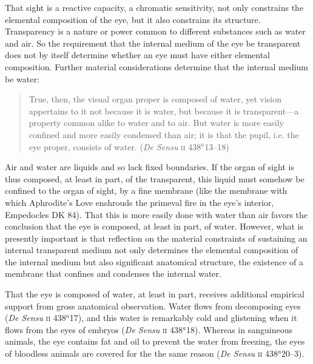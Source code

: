 That sight is a reactive capacity, a chromatic sensitivity, not only constrains the elemental composition of the eye, but it also constrains its structure. Transparency is a nature or power common to different substances such as water and air. So the requirement that the internal medium of the eye be transparent does not by itself determine whether an eye must have either elemental composition. Further material considerations determine that the internal medium be water:
\begin{quote}
	True, then, the visual organ proper is composed of water, yet vision appertains to it not because it is water, but because it is transparent---a property common alike to water and to air. But water is more easily confined and more easily condensed than air; it is that the pupil, i.e. the eye proper, consists of water. (\emph{De Sensu} \textsc{ii} 438\( ^{a} \)13--18)
\end{quote}
Air and water are liquids and so lack fixed boundaries. If the organ of sight is thus composed, at least in part, of the transparent, this liquid must somehow be confined to the organ of sight, by a fine membrane (like the membrane with which Aphrodite's Love enshrouds the primeval fire in the eye's interior, Empedocles DK 84). That this is more easily done with water than air favors the conclusion that the eye is composed, at least in part, of water. However, what is presently important is that reflection on the material constraints of sustaining an internal transparent medium not only determines the elemental composition of the internal medium but also significant anatomical structure, the existence of a membrane that confines and condenses the internal water.

That the eye is composed of water, at least in part, receives additional empirical support from gross anatomical observation. Water flows from decomposing eyes (\emph{De Sensu} \textsc{ii} 438\( ^{a} \)17), and this water is remarkably cold and glistening when it flows from the eyes of embryos (\emph{De Sensu} \textsc{ii} 438\( ^{a} \)18). Whereas in sanguineous animals, the eye contains fat and oil to prevent the water from freezing, the eyes of bloodless animals are covered for the the same reason (\emph{De Sensu} \textsc{ii} 438\( ^{a} \)20--3).


